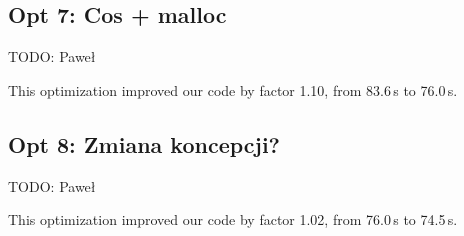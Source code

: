 \documentclass[11pt]{article}
\begin{document}
\subsection{Opt 7: Cos + malloc}
TODO: Paweł

This optimization improved our code by factor 1.10, from 83.6\,s to 76.0\,s.


\subsection{Opt 8: Zmiana koncepcji?}
TODO: Paweł

This optimization improved our code by factor 1.02, from 76.0\,s to 74.5\,s.
\end{document}

